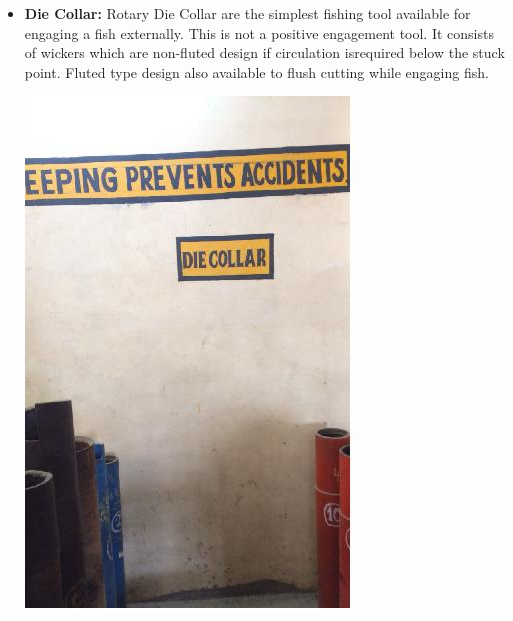 \begin{itemize}
\item \textbf{Die Collar:} Rotary Die Collar are the simplest fishing tool available
for engaging a fish externally. This is not a positive engagement tool.
It consists of wickers which are non-fluted design if circulation isrequired below the stuck point. Fluted type design also available to
flush cutting while engaging fish.

\includegraphics[scale=0.3]{images/Die_collar}

\end{itemize}



